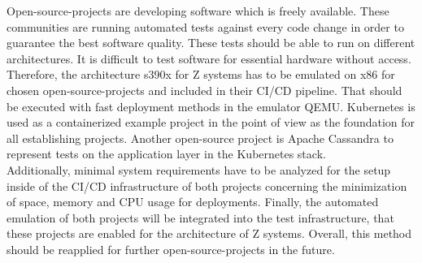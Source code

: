 Open-source-projects are developing software which is freely available. These communities are running automated tests against every code change in order to guarantee the best software quality. 
These tests should be able to run on different architectures. It is difficult to test software for essential hardware without access. Therefore, the architecture \gls{s390x} for \gls{Z systems} has to be emulated on x86 for chosen open-source-projects and included in their \gls{CI/CD} pipeline. That should be executed with fast deployment methods in the \gls{emulator} QEMU. Kubernetes is used as a \gls{containerized} example project in the point of view as the foundation for all establishing projects. Another open-source project is Apache Cassandra to represent tests on the \gls{application layer} in the Kubernetes stack. \\
Additionally, minimal system requirements have to be analyzed for the setup inside of the CI/CD infrastructure of both projects concerning the minimization of space, memory and CPU usage for deployments. Finally, the automated emulation of both projects will be integrated into the test infrastructure, that these projects are enabled for the architecture of Z systems. Overall, this method should be reapplied for further open-source-projects in the future.



